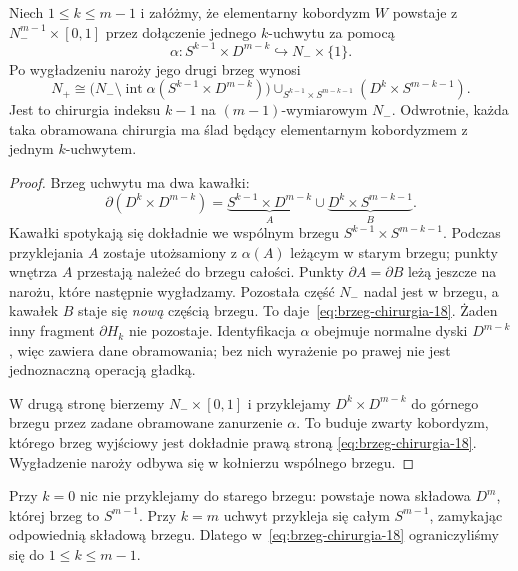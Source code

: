 \begin{twierdzenie}
\label{thm:slad-chirurgii-18}
Niech $1\leq k\leq m-1$ i załóżmy, że
elementarny kobordyzm $W$ powstaje z
$N_-^{m-1}\times[0,1]$ przez dołączenie
jednego $k$-uchwytu za pomocą
\[
 \alpha:S^{k-1}\times D^{m-k}
       \hookrightarrow N_-\times\{1\}.
\]
Po wygładzeniu naroży jego drugi brzeg wynosi
\begin{equation}\label{eq:brzeg-chirurgia-18}
 N_+\cong
 \bigl(N_-\setminus\operatorname{int}
        \alpha(S^{k-1}\times D^{m-k})\bigr)
 \mathop{\cup}_{S^{k-1}\times S^{m-k-1}}
       (D^k\times S^{m-k-1}).
\end{equation}
Jest to chirurgia indeksu $k-1$ na
$(m-1)$-wymiarowym $N_-$.
Odwrotnie, każda taka obramowana chirurgia
ma ślad będący elementarnym kobordyzmem
z jednym $k$-uchwytem.
\end{twierdzenie}
\begin{proof}
Brzeg uchwytu ma dwa kawałki:
\[
 \partial(D^k\times D^{m-k})
 =\underbrace{S^{k-1}\times D^{m-k}}_{A}
   \cup
   \underbrace{D^k\times S^{m-k-1}}_{B}.
\]
Kawałki spotykają się dokładnie we wspólnym
brzegu $S^{k-1}\times S^{m-k-1}$.
Podczas przyklejania $A$ zostaje utożsamiony
z $\alpha(A)$ leżącym w starym brzegu;
punkty wnętrza $A$ przestają należeć do brzegu całości.
Punkty $\partial A=\partial B$ leżą jeszcze na narożu,
które następnie wygładzamy.
Pozostała część $N_-$ nadal jest w brzegu,
a kawałek $B$ staje się \emph{nową} częścią
brzegu. To daje~\eqref{eq:brzeg-chirurgia-18}.
Żaden inny fragment $\partial H_k$ nie pozostaje.
Identyfikacja $\alpha$ obejmuje normalne dyski
$D^{m-k}$, więc zawiera dane obramowania;
bez nich wyrażenie po prawej nie jest
jednoznaczną operacją gładką.

W drugą stronę bierzemy $N_-\times[0,1]$
i przyklejamy $D^k\times D^{m-k}$ do górnego
brzegu przez zadane obramowane zanurzenie
$\alpha$. To buduje zwarty kobordyzm, którego
brzeg wyjściowy jest dokładnie prawą stroną
\eqref{eq:brzeg-chirurgia-18}. Wygładzenie
naroży odbywa się w kołnierzu wspólnego brzegu.
\end{proof}

\begin{uwaga}
Przy $k=0$ nic nie przyklejamy do starego
brzegu: powstaje nowa składowa $D^m$,
której brzeg to $S^{m-1}$. Przy $k=m$
uchwyt przykleja się całym $S^{m-1}$,
zamykając odpowiednią składową brzegu.
Dlatego w~\eqref{eq:brzeg-chirurgia-18}
ograniczyliśmy się do $1\leq k\leq m-1$.
\end{uwaga}

